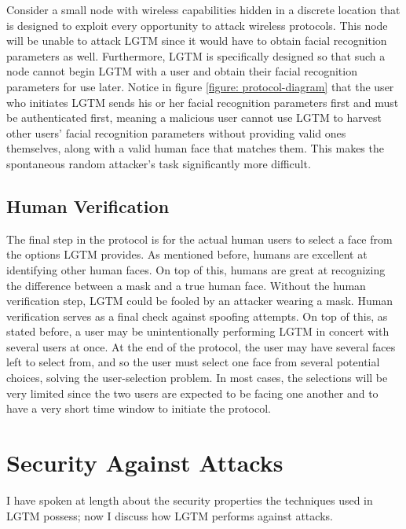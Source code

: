 \documentclass[12pt]{report}
\begin{document}
Consider a small node with wireless capabilities hidden in a discrete location that is designed to exploit every opportunity to attack wireless protocols. This node will be unable to attack LGTM since it would have to obtain facial recognition parameters as well. Furthermore, LGTM is specifically designed so that such a node cannot begin LGTM with a user and obtain their facial recognition parameters for use later. Notice in figure \ref{figure: protocol-diagram} that the user who initiates LGTM sends his or her facial recognition parameters first and must be authenticated first, meaning a malicious user cannot use LGTM to harvest other users' facial recognition parameters without providing valid ones themselves, along with a valid human face that matches them. This makes the spontaneous random attacker's task significantly more difficult. \par

\subsection{Human Verification}
The final step in the protocol is for the actual human users to select a face from the options LGTM provides. As mentioned before, humans are excellent at identifying other human faces. On top of this, humans are great at recognizing the difference between a mask and a true human face. Without the human verification step, LGTM could be fooled by an attacker wearing a mask. Human verification serves as a final check against spoofing attempts. On top of this, as stated before, a user may be unintentionally performing LGTM in concert with several users at once. At the end of the protocol, the user may have several faces left to select from, and so the user must select one face from several potential choices, solving the user-selection problem. In most cases, the selections will be very limited since the two users are expected to be facing one another and to have a very short time window to initiate the protocol. \par


\section{Security Against Attacks}
I have spoken at length about the security properties the techniques used in LGTM possess; now I discuss how LGTM performs against attacks. \par
\end{document}
